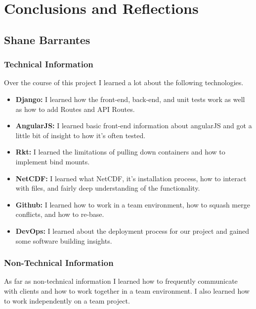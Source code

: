 \documentclass[onecolumn, draftclsnofoot,10pt, compsoc]{article}
\begin{document}

\section{Conclusions and Reflections}

    \subsection{Shane Barrantes}
        \subsubsection{Technical Information}
        Over the course of this project I learned a lot about the following technologies.
        \begin{itemize}
            \item \textbf{Django:} I learned how the front-end, back-end, and unit tests work as well as how to add Routes and API Routes.
            \item \textbf{AngularJS:} I learned basic front-end information about angularJS and got a little bit of insight to how it's often tested.
            \item \textbf{Rkt:} I learned the limitations of pulling down containers and how to implement bind mounts.
            \item \textbf{NetCDF:} I learned what NetCDF, it's installation process, how to interact with files, and fairly deep understanding of the functionality.
            \item \textbf{Github:} I learned how to work in a team environment, how to squash merge conflicts, and how to re-base.
            \item \textbf{DevOps:} I learned about the deployment process for our project and gained some software building insights.
        \end{itemize}
        
        \subsubsection{Non-Technical Information}
        As far as non-technical information I learned how to frequently communicate with clients and how to work together in a team environment. I also learned how to work independently on a team project.
\end{document}
